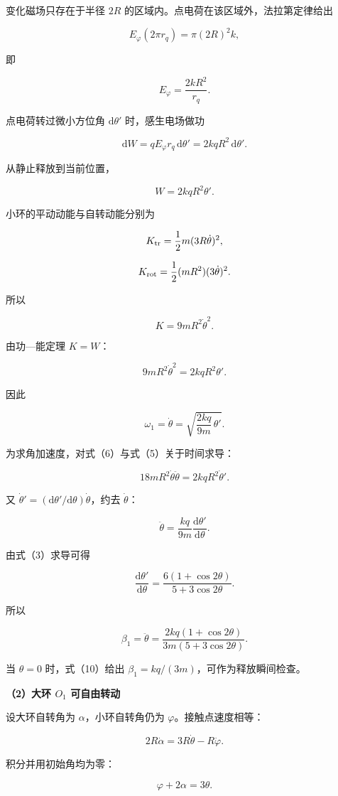 \documentclass[12pt,a4paper,UTF8]{ctexart}
\begin{document}
变化磁场只存在于半径 \(2R\) 的区域内。点电荷在该区域外，法拉第定律给出

\[E_\varphi(2\pi r_q)=\pi(2R)^2k,\]

即

\[E_\varphi=\frac{2kR^2}{r_q}. \tag{4}\]

点电荷转过微小方位角 \(\mathrm d\theta'\) 时，感生电场做功

\[\mathrm dW=qE_\varphi r_q\,\mathrm d\theta'
=2kqR^2\,\mathrm d\theta'.\]

从静止释放到当前位置，

\[W=2kqR^2\theta'. \tag{5}\]

小环的平动动能与自转动能分别为

\[K_{\rm tr}=\frac12m(3R\dot\theta)^2,\]

\[K_{\rm rot}=\frac12(mR^2)(3\dot\theta)^2.\]

所以

\[K=9mR^2\dot\theta^2. \tag{6}\]

由功---能定理 \(K=W\)：

\[9mR^2\dot\theta^2=2kqR^2\theta'.\]

因此

\[\boxed{
\omega_1=\dot\theta
=\sqrt{\frac{2kq}{9m}\,\theta'}
}. \tag{7}\]

为求角加速度，对式（6）与式（5）关于时间求导：

\[18mR^2\dot\theta\ddot\theta
=2kqR^2\dot\theta'.\]

又 \(\dot\theta'=(\mathrm d\theta'/\mathrm d\theta)\dot\theta\)，约去
\(\dot\theta\)：

\[\ddot\theta=\frac{kq}{9m}\frac{\mathrm d\theta'}{\mathrm d\theta}. \tag{8}\]

由式（3）求导可得

\[\frac{\mathrm d\theta'}{\mathrm d\theta}
=\frac{6(1+\cos2\theta)}{5+3\cos2\theta}. \tag{9}\]

所以

\[\boxed{
\beta_1=\ddot\theta
=\frac{2kq(1+\cos2\theta)}{3m(5+3\cos2\theta)}
}. \tag{10}\]

当 \(\theta=0\) 时，式（10）给出
\(\beta_1=kq/(3m)\)，可作为释放瞬间检查。

\textbf{（2）大环 \(O_1\) 可自由转动}

设大环自转角为 \(\alpha\)，小环自转角仍为 \(\varphi\)。接触点速度相等：

\[2R\dot\alpha=3R\dot\theta-R\dot\varphi.\]

积分并用初始角均为零：

\[\boxed{\varphi+2\alpha=3\theta}. \tag{11}\]
\end{document}
